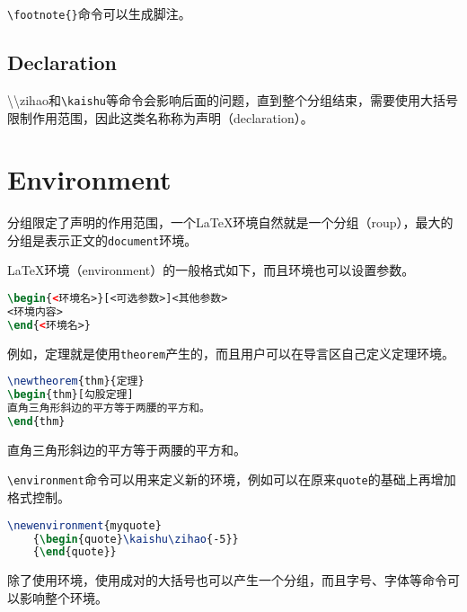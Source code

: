 \texttt{\textbackslash footnote\{\}}命令可以生成脚注。


\section{Declaration}

\textbackslash{\textbackslash zihao}和\texttt{\textbackslash kaishu}等命令会影响后面的问题，直到整个分组结束，需要使用大括号限制作用范围，因此这类名称称为声明（declaration）。

\chapter{Environment}


分组限定了声明的作用范围，一个\LaTeX 环境自然就是一个分组（roup），最大的分组是表示正文的\texttt{document}环境。

\LaTeX 环境（environment）的一般格式如下，而且环境也可以设置参数。


\begin{lstlisting}[language=TeX]
\begin{<环境名>}[<可选参数>]<其他参数>
<环境内容>
\end{<环境名>}
\end{lstlisting}

例如，定理就是使用\texttt{theorem}产生的，而且用户可以在导言区自己定义定理环境。

\begin{lstlisting}[language=TeX]
\newtheorem{thm}{定理}
\begin{thm}[勾股定理]
直角三角形斜边的平方等于两腰的平方和。
\end{thm}
\end{lstlisting}

\begin{thm}[勾股定理]
直角三角形斜边的平方等于两腰的平方和。
\end{thm}



\texttt{\textbackslash environment}命令可以用来定义新的环境，例如可以在原来\texttt{quote}的基础上再增加格式控制。


\begin{lstlisting}[language=TeX]
\newenvironment{myquote}
	{\begin{quote}\kaishu\zihao{-5}}
	{\end{quote}}
\end{lstlisting}

除了使用环境，使用成对的大括号也可以产生一个分组，而且字号、字体等命令可以影响整个环境。



